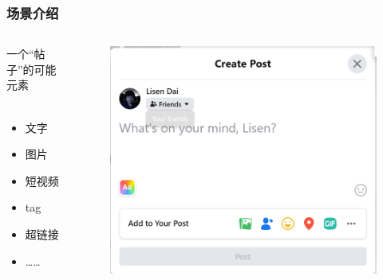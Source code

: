 \documentclass[10pt]{beamer}
\begin{document}
    \begin{frame}
        \frametitle{场景介绍}
        \begin{columns}
            \begin{column}{.3\linewidth}
                {\large 一个“帖子”的可能元素} \\
                \hspace*{\fill} \\
                \begin{itemize}
                    \item 文字
                    \item 图片
                    \item 短视频
                    \item tag
                    \item 超链接
                    \item ……
                \end{itemize}

            \end{column}

            \begin{column}{.5\linewidth}
                
                \begin{figure}[h]
                    \centering
                    \includegraphics[scale=0.24]{src/img/Facebook.png} \\
                \end{figure}


\end{column}
\end{columns}
\end{frame}
\end{document}
